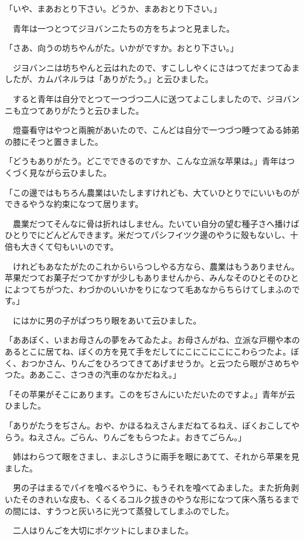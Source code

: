 \documentclass[tate,paper=b6j,jafontsize=9pt]{jlreq}
\begin{document}
「いや、まあおとり下さい。どうか、まあおとり下さい。」

　青年は一つとつてジヨバンニたちの方をちよつと見ました。

「さあ、向うの坊ちやんがた。いかがですか。おとり下さい。」

　ジヨバンニは坊ちやんと云はれたので、すこししやくにさはつてだまつてゐましたが、カムパネルラは「ありがたう。」と云ひました。

　すると青年は自分でとつて一つづつ二人に送つてよこしましたので、ジヨバンニも立つてありがたうと云ひました。

　燈臺看守はやつと兩腕があいたので、こんどは自分で一つづつ睡つてゐる姉弟の膝にそつと置きました。

「どうもありがたう。どこでできるのですか、こんな立派な苹果は。」青年はつくづく見ながら云ひました。

「この邊ではもちろん農業はいたしますけれども、大ていひとりでにいいものができるやうな約束になつて居ります。

　農業だつてそんなに骨は折れはしません。たいてい自分の望む種子さへ播けばひとりでにどんどんできます。米だつてパシフイツク邊のやうに殼もないし、十倍も大きくて匂もいいのです。

　けれどもあなたがたのこれからいらつしやる方なら、農業はもうありません。苹果だつてお菓子だつてかすが少しもありませんから、みんなそのひとそのひとによつてちがつた、わづかのいいかをりになつて毛あなからちらけてしまふのです。」

　にはかに男の子がぱつちり眼をあいて云ひました。

「ああぼく、いまお母さんの夢をみてゐたよ。お母さんがね、立派な戸棚や本のあるとこに居てね、ぼくの方を見て手をだしてにこにこにこにこわらつたよ。ぼく、おつかさん、りんごをひろつてきてあげませうか。と云つたら眼がさめちやつた。ああここ、さつきの汽車のなかだねえ。」

「その苹果がそこにあります。このをぢさんにいただいたのですよ。」青年が云ひました。

「ありがたうをぢさん。おや、かほるねえさんまだねてるねえ、ぼくおこしてやらう。ねえさん。ごらん、りんごをもらつたよ。おきてごらん。」

　姉はわらつて眼をさまし、まぶしさうに兩手を眼にあてて、それから苹果を見ました。

　男の子はまるでパイを喰べるやうに、もうそれを喰べてゐました。また折角剥いたそのきれいな皮も、くるくるコルク拔きのやうな形になつて床へ落ちるまでの間には、すうつと灰いろに光つて蒸發してしまふのでした。

　二人はりんごを大切にポケツトにしまひました。
\end{document}
